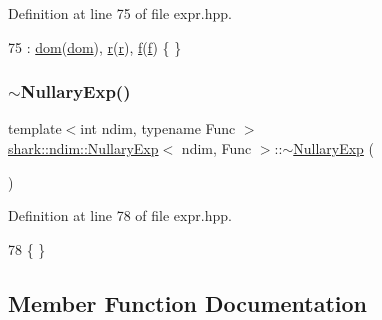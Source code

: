 Definition at line 75 of file expr.\+hpp.


\begin{DoxyCode}
75 : \hyperlink{classshark_1_1ndim_1_1_nullary_exp_a4af666c034e0035ca4a9c4f8cf2f2ea2}{dom}(\hyperlink{classshark_1_1ndim_1_1_nullary_exp_a4af666c034e0035ca4a9c4f8cf2f2ea2}{dom}), \hyperlink{classshark_1_1ndim_1_1_nullary_exp_a2ab3c895de1618318f8864c90cd7b21e}{r}(\hyperlink{classshark_1_1ndim_1_1_nullary_exp_a2ab3c895de1618318f8864c90cd7b21e}{r}), \hyperlink{classshark_1_1ndim_1_1_nullary_exp_a30f367c05cd7978aedec0a99ca82ed0e}{f}(\hyperlink{classshark_1_1ndim_1_1_nullary_exp_a30f367c05cd7978aedec0a99ca82ed0e}{f}) \{ \}
\end{DoxyCode}
\hypertarget{classshark_1_1ndim_1_1_nullary_exp_a8ec438084517a13c115bd6979023abf1}{}\label{classshark_1_1ndim_1_1_nullary_exp_a8ec438084517a13c115bd6979023abf1} 
\subsubsection{\texorpdfstring{$\sim$\+Nullary\+Exp()}{~NullaryExp()}}
{\footnotesize\ttfamily template$<$int ndim, typename Func $>$ \\
\hyperlink{classshark_1_1ndim_1_1_nullary_exp}{shark\+::ndim\+::\+Nullary\+Exp}$<$ ndim, Func $>$\+::$\sim$\hyperlink{classshark_1_1ndim_1_1_nullary_exp}{Nullary\+Exp} (\begin{DoxyParamCaption}{ }\end{DoxyParamCaption})}



Definition at line 78 of file expr.\+hpp.


\begin{DoxyCode}
78 \{ \}
\end{DoxyCode}


\subsection{Member Function Documentation}
\hypertarget{classshark_1_1ndim_1_1_nullary_exp_ae6e867ba02940b7f1204e2910c781a9f}{}\label{classshark_1_1ndim_1_1_nullary_exp_ae6e867ba02940b7f1204e2910c781a9f} 
